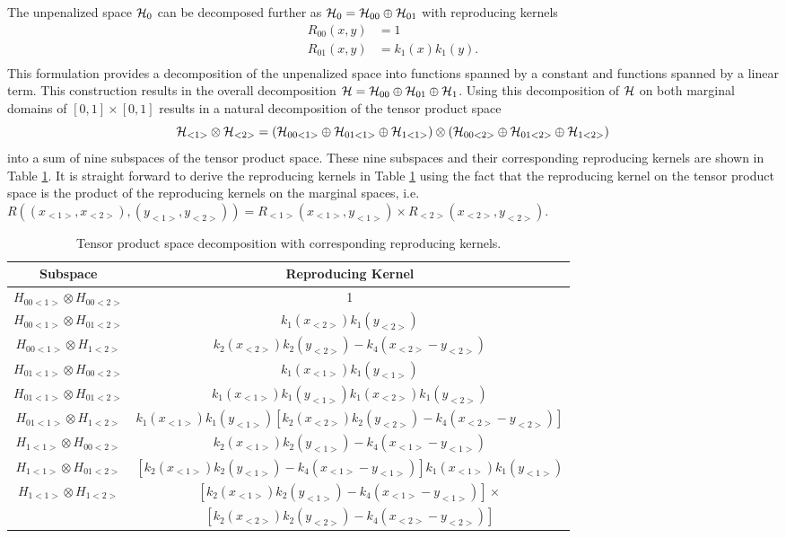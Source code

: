 The unpenalized space $\mathcal{H}_0$ can be decomposed further as $\mathcal{H}_0 = \mathcal{H}_{00} \oplus \mathcal{H}_{01}$ with reproducing kernels 
\begin{align*}
	R_{00}(x,y) &= 1\\
	R_{01}(x,y) &= k_1(x)k_1(y).\\
\end{align*}
This formulation provides a decomposition of the unpenalized space into functions spanned by a constant and functions spanned by a linear term. This construction results in the overall decomposition $\mathcal{H}= \mathcal{H}_{00} \oplus \mathcal{H}_{01} \oplus \mathcal{H}_1$. Using this decomposition of $\mathcal{H}$ on both marginal domains of $[0,1] \times [0,1]$ results in a natural decomposition of the tensor product space
\[ \mathcal{H}_{<1>} \otimes \mathcal{H}_{<2>} = (\mathcal{H}_{00<1>} \oplus \mathcal{H}_{01<1>} \oplus \mathcal{H}_{1<1>})\otimes (\mathcal{H}_{00<2>} \oplus \mathcal{H}_{01<2>} \oplus \mathcal{H}_{1<2>}) \]
into a sum of nine subspaces of the tensor product space. These nine subspaces and their corresponding reproducing kernels are shown in Table \ref{tab:tp decomp}. It is straight forward to derive the reproducing kernels in Table \ref{tab:tp decomp} using the fact that the reproducing kernel on the tensor product space is the product of the reproducing kernels on the marginal spaces, i.e. $R((x_{<1>}, x_{<2>}), (y_{<1>}, y_{<2>}) ) = R_{<1>}(x_{<1>}, y_{<1>})\times R_{<2>}(x_{<2>}, y_{<2>})$. 
\begin{table}
	[h] \centering \caption{Tensor product space decomposition with corresponding reproducing kernels.} \label{tab:tp decomp} 
	\begin{tabular}
		{|c|c|} \hline Subspace & Reproducing Kernel\tabularnewline \hline \hline $H_{00<1>}\otimes H_{00<2>}$ & 1\tabularnewline \hline $H_{00<1>}\otimes H_{01<2>}$ & $k_{1}(x_{<2>})k_{1}(y_{<2>})$\tabularnewline \hline $H_{00<1>}\otimes H_{1<2>}$ & $k_2(x_{<2>})k_2(y_{<2>}) - k_4(x_{<2>} - y_{<2>})$\tabularnewline \hline $H_{01<1>}\otimes H_{00<2>}$ & $k_1(x_{<1>})k_1(y_{<1>})$ \tabularnewline \hline $H_{01<1>}\otimes H_{01<2>}$ & $k_1(x_{<1>})k_1(y_{<1>})k_1(x_{<2>})k_1(y_{<2>})$ \tabularnewline \hline $H_{01<1>}\otimes H_{1<2>}$ & $k_1(x_{<1>})k_1(y_{<1>})[k_2(x_{<2>})k_2(y_{<2>}) - k_4(x_{<2>} - y_{<2>})]$\tabularnewline \hline $H_{1<1>}\otimes H_{00<2>}$ & $k_2(x_{<1>})k_2(y_{<1>}) - k_4(x_{<1>} - y_{<1>})$\tabularnewline \hline $H_{1<1>}\otimes H_{01<2>}$ & $[k_2(x_{<1>})k_2(y_{<1>}) - k_4(x_{<1>} - y_{<1>})]k_1(x_{<1>})k_1(y_{<1>})$\tabularnewline \hline $H_{1<1>}\otimes H_{1<2>}$ & $[k_2(x_{<1>})k_2(y_{<1>}) - k_4(x_{<1>} - y_{<1>})]\times$ \tabularnewline & $[k_2(x_{<2>})k_2(y_{<2>}) - k_4(x_{<2>} - y_{<2>})]$\tabularnewline \hline 
	\end{tabular}
\end{table}

